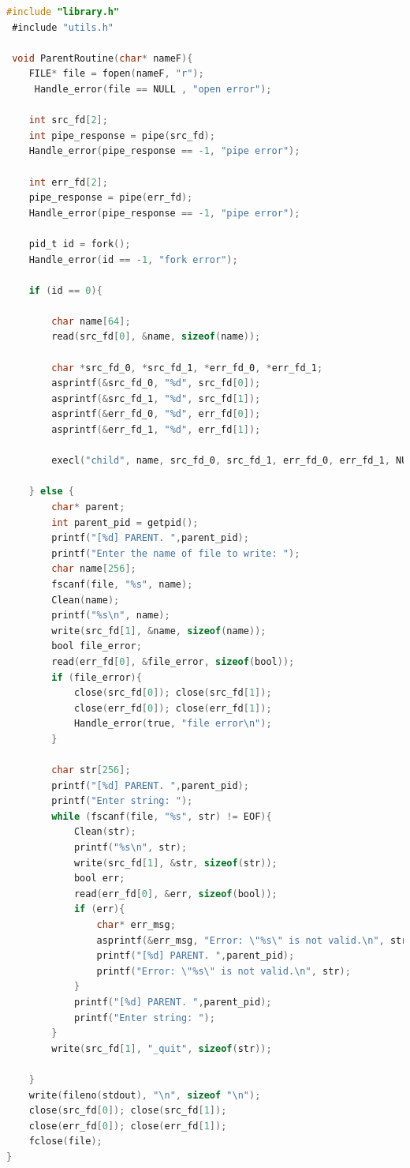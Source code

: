 \documentclass[pdf, unicode, 12pt, a4paper,oneside,fleqn]{article}
\begin{document}
\begin{lstlisting}[language=C]
 #include "library.h"
 #include "utils.h"

 void ParentRoutine(char* nameF){
    FILE* file = fopen(nameF, "r");
     Handle_error(file == NULL , "open error");

    int src_fd[2];
    int pipe_response = pipe(src_fd);
    Handle_error(pipe_response == -1, "pipe error");

    int err_fd[2];
    pipe_response = pipe(err_fd);
    Handle_error(pipe_response == -1, "pipe error");

    pid_t id = fork();
    Handle_error(id == -1, "fork error");

    if (id == 0){

        char name[64];
        read(src_fd[0], &name, sizeof(name));

        char *src_fd_0, *src_fd_1, *err_fd_0, *err_fd_1;
        asprintf(&src_fd_0, "%d", src_fd[0]);
        asprintf(&src_fd_1, "%d", src_fd[1]);
        asprintf(&err_fd_0, "%d", err_fd[0]);
        asprintf(&err_fd_1, "%d", err_fd[1]);

        execl("child", name, src_fd_0, src_fd_1, err_fd_0, err_fd_1, NULL);

    } else {
        char* parent;
        int parent_pid = getpid();
        printf("[%d] PARENT. ",parent_pid);
        printf("Enter the name of file to write: ");
        char name[256];
        fscanf(file, "%s", name);
        Clean(name);
        printf("%s\n", name);
        write(src_fd[1], &name, sizeof(name));
        bool file_error;
        read(err_fd[0], &file_error, sizeof(bool));
        if (file_error){
            close(src_fd[0]); close(src_fd[1]);
            close(err_fd[0]); close(err_fd[1]);
            Handle_error(true, "file error\n");
        }

        char str[256];
        printf("[%d] PARENT. ",parent_pid);
        printf("Enter string: ");
        while (fscanf(file, "%s", str) != EOF){
            Clean(str);
            printf("%s\n", str);
            write(src_fd[1], &str, sizeof(str));
            bool err;
            read(err_fd[0], &err, sizeof(bool));
            if (err){
                char* err_msg;
                asprintf(&err_msg, "Error: \"%s\" is not valid.\n", str);
                printf("[%d] PARENT. ",parent_pid);
                printf("Error: \"%s\" is not valid.\n", str);
            }
            printf("[%d] PARENT. ",parent_pid);
            printf("Enter string: ");
        }
        write(src_fd[1], "_quit", sizeof(str));

    }
    write(fileno(stdout), "\n", sizeof "\n");
    close(src_fd[0]); close(src_fd[1]);
    close(err_fd[0]); close(err_fd[1]);
    fclose(file);
}
\end{lstlisting}
\end{document}
